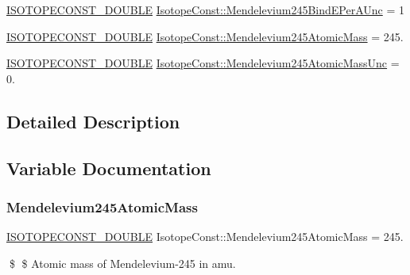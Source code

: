 \begin{DoxyCompactItemize}
\item 
\mbox{\hyperlink{group___isotope_const-_macros_ga8f45a7272ce02c0b4c65c44636ed719a}{I\+S\+O\+T\+O\+P\+E\+C\+O\+N\+S\+T\+\_\+\+D\+O\+U\+B\+LE}} \mbox{\hyperlink{group___isotope_const-_mendelevium-_md245_gaea430c7d578af6388554776c7f9483ba}{Isotope\+Const\+::\+Mendelevium245\+Bind\+E\+Per\+A\+Unc}} = 1
\item 
\mbox{\hyperlink{group___isotope_const-_macros_ga8f45a7272ce02c0b4c65c44636ed719a}{I\+S\+O\+T\+O\+P\+E\+C\+O\+N\+S\+T\+\_\+\+D\+O\+U\+B\+LE}} \mbox{\hyperlink{group___isotope_const-_mendelevium-_md245_ga2f4db94e3fe5a13e6800f22c25923e4f}{Isotope\+Const\+::\+Mendelevium245\+Atomic\+Mass}} = 245.
\item 
\mbox{\hyperlink{group___isotope_const-_macros_ga8f45a7272ce02c0b4c65c44636ed719a}{I\+S\+O\+T\+O\+P\+E\+C\+O\+N\+S\+T\+\_\+\+D\+O\+U\+B\+LE}} \mbox{\hyperlink{group___isotope_const-_mendelevium-_md245_ga769816a2ae0f8200848f8a36806afbea}{Isotope\+Const\+::\+Mendelevium245\+Atomic\+Mass\+Unc}} = 0.
\end{DoxyCompactItemize}


\subsection{Detailed Description}


\subsection{Variable Documentation}
\mbox{\label{group___isotope_const-_mendelevium-_md245_ga2f4db94e3fe5a13e6800f22c25923e4f}} 
\subsubsection{\texorpdfstring{Mendelevium245\+Atomic\+Mass}{Mendelevium245AtomicMass}}
{\footnotesize\ttfamily \mbox{\hyperlink{group___isotope_const-_macros_ga8f45a7272ce02c0b4c65c44636ed719a}{I\+S\+O\+T\+O\+P\+E\+C\+O\+N\+S\+T\+\_\+\+D\+O\+U\+B\+LE}} Isotope\+Const\+::\+Mendelevium245\+Atomic\+Mass = 245.}

\$ \$ Atomic mass of Mendelevium-\/245 in amu. \mbox{\label{group___isotope_const-_mendelevium-_md245_ga769816a2ae0f8200848f8a36806afbea}} 

